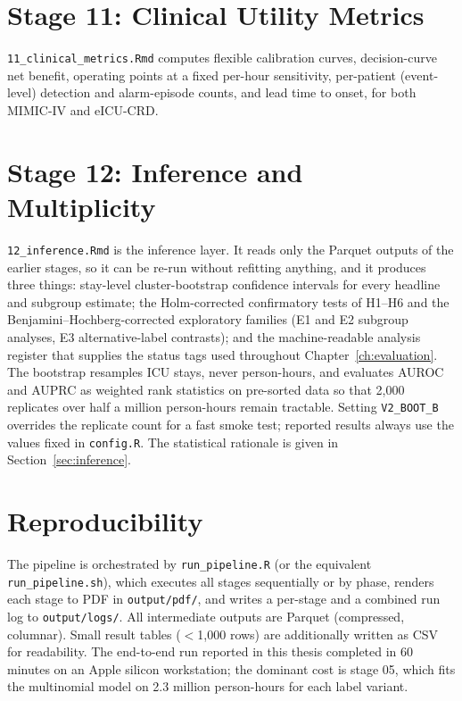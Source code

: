 \section{Stage 11: Clinical Utility Metrics}

\texttt{11\_clinical\_metrics.Rmd} computes flexible calibration curves,
decision-curve net benefit, operating points at a fixed per-hour sensitivity,
per-patient (event-level) detection and alarm-episode counts, and lead time
to onset, for both MIMIC-IV and eICU-CRD.


\section{Stage 12: Inference and Multiplicity}

\texttt{12\_inference.Rmd} is the inference layer. It reads only the Parquet
outputs of the earlier stages, so it can be re-run without refitting anything,
and it produces three things: stay-level cluster-bootstrap confidence intervals
for every headline and subgroup estimate; the Holm-corrected confirmatory tests
of H1--H6 and the Benjamini--Hochberg-corrected exploratory families (E1 and E2
subgroup analyses, E3 alternative-label contrasts); and the machine-readable
analysis register that supplies the status tags used
throughout Chapter~\ref{ch:evaluation}. The bootstrap resamples ICU stays, never
person-hours, and evaluates AUROC and AUPRC as weighted rank statistics on
pre-sorted data so that 2,000 replicates over half a million person-hours
remain tractable. Setting \texttt{V2\_BOOT\_B} overrides the replicate count
for a fast smoke test; reported results always use the values fixed in
\texttt{config.R}. The statistical rationale is given in
Section~\ref{sec:inference}.


\section{Reproducibility}

The pipeline is orchestrated by \texttt{run\_pipeline.R} (or the equivalent
\texttt{run\_pipeline.sh}), which executes all stages sequentially or by phase,
renders each stage to PDF in \texttt{output/pdf/}, and writes a per-stage and a
combined run log to \texttt{output/logs/}. All intermediate outputs are Parquet
(compressed, columnar). Small result tables ($<$1,000 rows) are additionally
written as CSV for readability. The end-to-end run reported in this thesis
completed in 60 minutes on an Apple silicon workstation; the dominant cost is
stage 05, which fits the multinomial model on 2.3 million person-hours for each
label variant.

